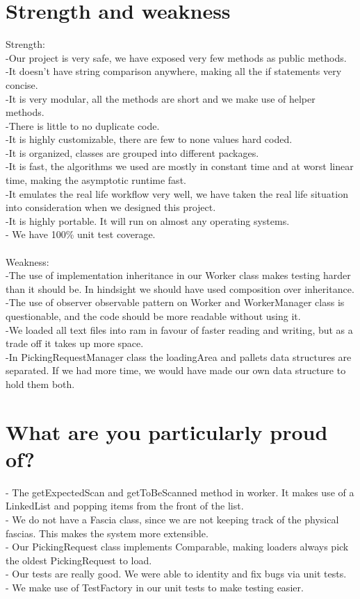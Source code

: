 \documentclass[12pt]{article}
\begin{document}
\section*{Strength and weakness}
Strength:\\
-Our project is very safe, we have exposed very few methods as public methods.\\
-It doesn't have string comparison anywhere, making all the if statements very \\concise.\\
-It is very modular, all the methods are short and we make use of helper methods.\\
-There is little to no duplicate code.\\
-It is highly customizable, there are few to none values hard coded.\\
-It is organized, classes are grouped into different packages.\\
-It is fast, the algorithms we used are mostly in constant time and at worst linear time, making the asymptotic runtime fast.\\ 
-It emulates the real life workflow very well, we have taken the real life situation into consideration when we designed this project.\\
-It is highly portable. It will run on almost any operating systems. \\
- We have 100\% unit test coverage. \\
\hfill\\
Weakness:\\
-The use of implementation inheritance in our Worker class makes testing harder than it should be. In hindsight we should have used composition over inheritance.\\
-The use of observer observable pattern on Worker and WorkerManager class is questionable, and the code should be more readable without using it.\\
-We loaded all text files into ram in favour of faster reading and writing, but as a trade off it takes up more space.\\
-In PickingRequestManager class the loadingArea and pallets data structures are separated. If we had more time, we would have made our own data structure to hold them both.\\
\pagebreak
\section*{What are you particularly proud of?}
- The getExpectedScan and getToBeScanned method in worker. It makes use of a LinkedList and popping items from the front of the list.\\
- We do not have a Fascia class, since we are not keeping track of the physical fascias. This makes the system more extensible.\\
- Our PickingRequest class implements Comparable, making loaders always pick the oldest PickingRequest to load.\\
- Our tests are really good. We were able to identity and fix bugs via unit tests.\\
- We make use of TestFactory in our unit tests to make testing easier.
\pagebreak
\end{document}
